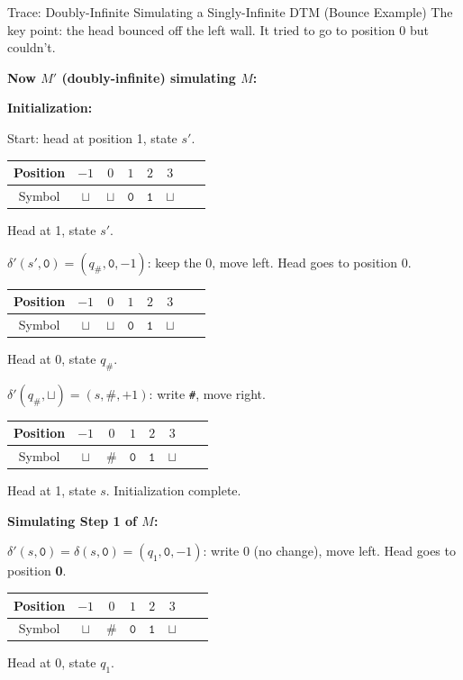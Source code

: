 \begin{examplebox}{{Trace: Doubly-Infinite Simulating a Singly-Infinite DTM (Bounce Example)}}
The key point: the head bounced off the left wall. It tried to go to position 0
but couldn't.

\textbf{Now $M'$ (doubly-infinite) simulating $M$:}

\textbf{Initialization:}

Start: head at position 1, state $s'$.

\begin{center}
\begin{tabular}{c|ccccccc}
Position & $-1$ & $0$ & $1$ & $2$ & $3$ \\
\hline
Symbol & $\sqcup$ & $\sqcup$ & $\mathtt{0}$ & $\mathtt{1}$ & $\sqcup$ \\
\end{tabular}
\quad Head at 1, state $s'$.
\end{center}

$\delta'(s', \mathtt{0}) = (q_\#, \mathtt{0}, -1)$: keep the 0, move left.
Head goes to position 0.

\begin{center}
\begin{tabular}{c|ccccccc}
Position & $-1$ & $0$ & $1$ & $2$ & $3$ \\
\hline
Symbol & $\sqcup$ & $\sqcup$ & $\mathtt{0}$ & $\mathtt{1}$ & $\sqcup$ \\
\end{tabular}
\quad Head at 0, state $q_\#$.
\end{center}

$\delta'(q_\#, \sqcup) = (s, \#, +1)$: write \texttt{\#}, move right.

\begin{center}
\begin{tabular}{c|ccccccc}
Position & $-1$ & $0$ & $1$ & $2$ & $3$ \\
\hline
Symbol & $\sqcup$ & $\#$ & $\mathtt{0}$ & $\mathtt{1}$ & $\sqcup$ \\
\end{tabular}
\quad Head at 1, state $s$. Initialization complete.
\end{center}

\textbf{Simulating Step 1 of $M$:}

$\delta'(s, \mathtt{0}) = \delta(s, \mathtt{0}) = (q_1, \mathtt{0}, -1)$:
write 0 (no change), move left. Head goes to position \textbf{0}.

\begin{center}
\begin{tabular}{c|ccccccc}
Position & $-1$ & $0$ & $1$ & $2$ & $3$ \\
\hline
Symbol & $\sqcup$ & $\#$ & $\mathtt{0}$ & $\mathtt{1}$ & $\sqcup$ \\
\end{tabular}
\quad Head at 0, state $q_1$.
\end{center}


\end{examplebox}
